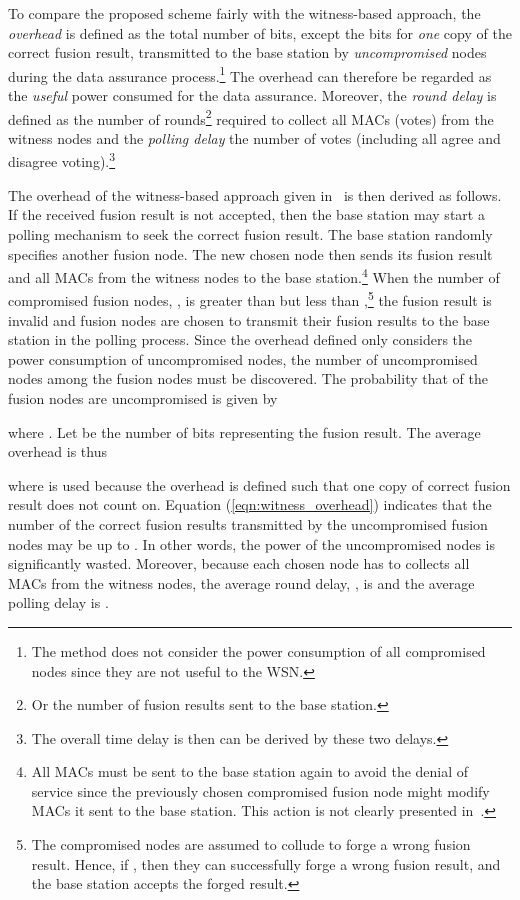 \documentclass[12pt, onecolumn, draftcls]{IEEEtran}
\begin{document}
To compare the proposed scheme fairly with the witness-based
approach, the {\it overhead} is defined as the total number of bits,
except the bits for {\it one} copy of the correct fusion result,
transmitted to the base station by {\it uncompromised} nodes during
the data assurance process.\footnote{The method does not consider
the power consumption of all compromised nodes since they are not
useful to the WSN.} The overhead can therefore be regarded as the
{\it useful} power consumed for the data assurance. Moreover, the
{\it round delay} is defined as the number of rounds\footnote{Or the
number of fusion results sent to the base station.} required to
collect all MACs (votes) from the witness nodes and the {\it polling
delay} the number of votes (including all agree and disagree
voting).\footnote{The overall time delay is then can be derived by
these two delays.}

The overhead of the witness-based approach given
in~\cite{du:assurance} is then derived as follows. If the received
fusion result is not accepted, then the base station may start a
polling mechanism to seek the correct fusion result. The base
station randomly specifies another fusion node. The new chosen node
then sends its fusion result and all MACs from the witness nodes to
the base station.\footnote{All MACs must be sent to the base station
again to avoid the denial of service since the previously chosen
compromised fusion node might modify MACs it sent to the base
station. This action is not clearly presented
in~\cite{du:assurance}.} When the number of compromised fusion
nodes, , is greater than  but less than
,\footnote{The  compromised nodes are assumed to collude to
forge a wrong fusion result. Hence, if , then they can
successfully forge a wrong fusion result, and the base station
accepts the forged result.} the fusion result is invalid and 
fusion nodes are chosen to transmit their fusion results to the base
station in the polling process. Since the overhead defined only
considers the power consumption of uncompromised nodes, the number
of uncompromised nodes among the  fusion nodes must be
discovered. The probability that  of the  fusion nodes are
uncompromised is given by \setlength{\arraycolsep}{0.0em}

\setlength{\arraycolsep}{5pt} where . Let  be
the number of bits representing the fusion result. The average
overhead is thus

where  is used because the overhead is defined such that one
copy of correct fusion result does not count on. Equation
(\ref{eqn:witness_overhead}) indicates that the number of the
correct fusion results transmitted by the uncompromised fusion nodes
may be up to . In other words, the power of the uncompromised
nodes is significantly wasted. Moreover, because each chosen node
has to collects all MACs from the witness nodes, the average round
delay, , is  and the average polling delay  is
.
\end{document}
